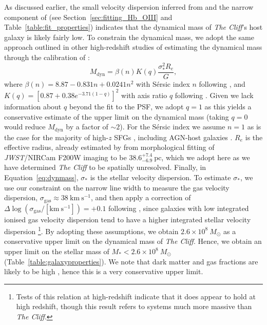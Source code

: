 \documentclass[fleqn,usenatbib]{mnras}
\newcommand{\jwst}{\textit{JWST}\xspace}
\newcommand{\Hbeta}{\text{H\textbeta}\xspace}
\newcommand{\cliff}{\textit{The Cliff}\xspace}
\begin{document}
As discussed earlier, the small velocity dispersion inferred from \OIIIL and the narrow component of \Hbeta (see Section~\ref{sec:fitting_Hb_OIII} and Table~\ref{table:fit_properties}) indicates that the dynamical mass of \cliff's host galaxy is likely fairly low. 
To constrain the dynamical mass, we adopt the same approach outlined in other high-redshift studies \citep[e.g.][]{Ji2025, Ubler2023, Maiolino2024_JADES, Ivey2026} of estimating the dynamical mass through the calibration of \cite{VanDerWel22}:
\begin{equation}
M_\mathrm{dyn} = \beta(n)K(q)\frac{\sigma_\ast^2 R_e}{G},
    \label{eq:dynmass}
\end{equation}
where $\beta(n) = 8.87 - 0.831n+0.0241n^2$ with Sérsic index $n$ following \cite{Cappellari2006}, and $K(q) = [0.87+0.38e^{-3.71(1-q)}]^2$ with axis ratio $q$ following \cite{VanDerWel22}. 
Given we lack information about $q$ beyond the fit to the PSF, we adopt $q=1$ as this yields a conservative estimate of the upper limit on the dynamical mass (taking $q = 0$ would reduce $M_\mathrm{dyn}$ by a factor of $\sim2$). 
For the Sérsic index we assume $n=1$ as is the case for the majority of high-$z$ SFGs \citep[][]{Ormerod2024, Danhaive2026}, including AGN-host galaxies \citep{Maiolino2024_JADES,Juodzbalis2026_JADEScensus}. $R_e$ is the effective radius, already estimated by \cite{deGraaff2025} from morphological fitting of \jwst/NIRCam F200W imaging to be $38.6^{+7.4}_{-6.9}\ \mathrm{pc}$, which we adopt here as we have determined \cliff to be spatially unresolved.
Finally, in Equation~\ref{eq:dynmass}, $\sigma_\ast$ is the stellar velocity dispersion. 
To estimate $\sigma_\ast$, we use our constraint on the narrow line width to measure the gas velocity dispersion, 
$\sigma_\mathrm{gas} \approx 38\
 \mathrm{km} \ \mathrm{s}^{-1}$, and then apply a correction of $\Delta \log(\sigma_\mathrm{gas} / [\mathrm{km} \ \mathrm{s}^{-1}]) = +0.1$ following \cite{Ubler2023},
since galaxies with low integrated ionised gas velocity dispersion tend to have a higher integrated stellar velocity dispersion
\citep{Bezanson18}\footnote{Tests of this relation at high-redshift \citep[e.g.][]{Carnall2023,DEugenio2024_Nature, Pascalau2026} indicate that it does appear to hold at high redshift, though this result refers to systems much more massive than \cliff.}. 
By adopting these assumptions, we obtain $2.6\times 10^8 \ M_\odot$ as a conservative upper limit on the dynamical mass of \cliff. 
Hence, we obtain an upper limit on the stellar mass of $M_\ast < 2.6\times 10^8 \ M_\odot$ (Table~\ref{table:galaxyproperties}). We note that dark matter and gas fractions are likely to be high \citep[see e.g.][]{Danhaive2026,McClymont2026_BH}, hence this is a very conservative upper limit.
\end{document}

